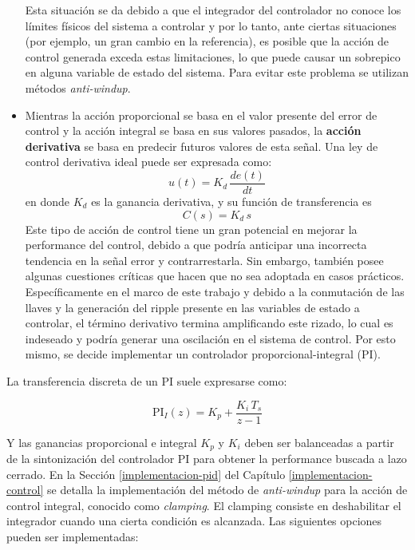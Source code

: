 \begin{itemize}
  Esta situación se da debido a que el integrador del controlador no conoce los límites físicos del sistema a controlar y por lo tanto, ante ciertas situaciones (por ejemplo, un gran cambio en la referencia), es posible que la acción de control generada exceda estas limitaciones, lo que puede causar un sobrepico en alguna variable de estado del sistema. Para evitar este problema se utilizan métodos \emph{anti-windup}.
  \item Mientras la acción proporcional se basa en el valor presente del error de control y la acción integral se basa en sus valores pasados, la \textbf{acción derivativa} se basa en predecir futuros valores de esta señal. Una ley de control derivativa ideal puede ser expresada como:
  \begin{equation*}
    u(t) = K_d \, \frac{d e(t)}{dt}
  \end{equation*}
  en donde $K_d$ es la ganancia derivativa, y su función de transferencia es 
  \begin{equation*}
    C(s) = K_d \, s 
  \end{equation*}
  Este tipo de acción de control tiene un gran potencial en mejorar la performance del control, debido a que podría anticipar una incorrecta tendencia en la señal error y contrarrestarla. Sin embargo, también posee algunas cuestiones críticas que hacen que no sea adoptada en casos prácticos. Específicamente en el marco de este trabajo y debido a la conmutación de las llaves y la generación del ripple presente en las variables de estado a controlar, el término derivativo termina amplificando este rizado, lo cual es indeseado y podría generar una oscilación en el sistema de control. Por esto mismo, se decide implementar un controlador proporcional-integral (PI).
\end{itemize}

La transferencia discreta de un PI suele expresarse como: 

\begin{equation*}
  \mathrm{PI}_I(z) = K_p + \frac{K_i \, T_s}{z-1}
\end{equation*}

Y las ganancias proporcional e integral $K_p$ y $K_i$ deben ser balanceadas a partir de la sintonización del controlador PI para obtener la performance buscada a lazo cerrado. En la Sección \ref{implementacion-pid} del Capítulo \ref{implementacion-control} se detalla la implementación del método de \emph{anti-windup} para la acción de control integral, conocido como \emph{clamping}. El clamping consiste en deshabilitar el integrador cuando una cierta condición es alcanzada. Las siguientes opciones pueden ser implementadas:

